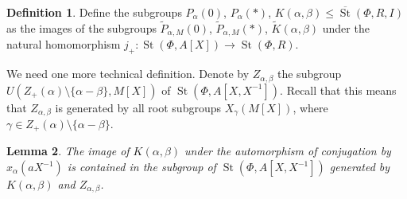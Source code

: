 \documentclass[oneside, 8pt]{amsart}
\newtheorem{lemma}{Lemma}
\theoremstyle{remark}
\theoremstyle{definition}
\numberwithin{lemma}{section}
\numberwithin{prop}{section}
\numberwithin{corollary}{section}
\numberwithin{externaltheorem}{section}
\newtheorem{df}[lemma]{Definition} \Crefname{df}{Definition}{Definitions}
\DeclareMathOperator{\St}{St}
\numberwithin{equation}{section}
\begin{document}
\begin{df} Define the subgroups $P_\alpha(0)$, $P_{\alpha}(*)$, $K(\alpha, \beta) \leq \overline{\St}(\Phi, R, I)$ as the images of the subgroups $\widetilde{P}_{\alpha, M}(0)$, $\widetilde{P}_{\alpha, M}(*)$, $\widetilde{K}(\alpha, \beta)$ under the natural homomorphism $j_+ \colon \St(\Phi, A[X]) \to \St(\Phi, R)$.\end{df}

We need one more technical definition. Denote by $Z_{\alpha, \beta}$ the subgroup $U(Z_+(\alpha) \setminus \{\alpha - \beta \}, M[X])$ of $\St(\Phi, A[X, X^{-1}])$.  Recall that this means that $Z_{\alpha, \beta}$ is generated by all root subgroups $X_\gamma(M[X])$, where $\gamma \in Z_+(\alpha) \setminus \{ \alpha - \beta \}$. 
  
\begin{lemma} \label{image-K-a-b} The image of $K(\alpha, \beta)$ under the automorphism of conjugation by $x_\alpha(aX^{-1})$ is contained in the subgroup of $\St(\Phi, A[X, X^{-1}])$ generated by $K(\alpha, \beta)$ and $Z_{\alpha, \beta}$. \end{lemma}
\end{document}

